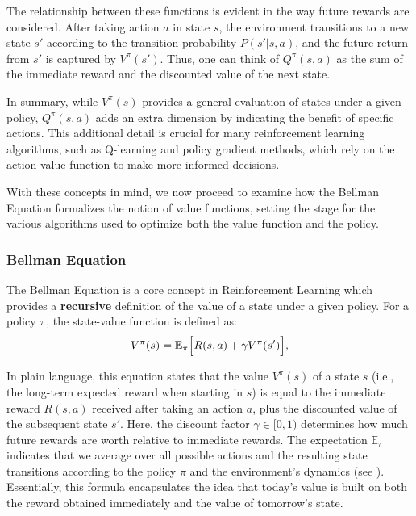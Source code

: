 \documentclass[12pt,a4paper,twoside,openany]{book}
\begin{document}
The relationship between these functions is evident in the way future rewards are considered. After taking action \(a\) in state \(s\), the environment transitions to a new state \(s'\) according to the transition probability \(P(s'|s,a)\), and the future return from \(s'\) is captured by \(V^\pi(s')\). Thus, one can think of \(Q^\pi(s,a)\) as the sum of the immediate reward and the discounted value of the next state.

In summary, while \(V^\pi(s)\) provides a general evaluation of states under a given policy, \(Q^\pi(s,a)\) adds an extra dimension by indicating the benefit of specific actions. This additional detail is crucial for many reinforcement learning algorithms, such as Q-learning and policy gradient methods, which rely on the action-value function to make more informed decisions.

With these concepts in mind, we now proceed to examine how the Bellman Equation formalizes the notion of value functions, setting the stage for the various algorithms used to optimize both the value function and the policy.

\subsubsection*{Bellman Equation}
The Bellman Equation is a core concept in Reinforcement Learning which provides a \textbf{recursive} definition of the value of a state under a given policy. For a policy \(\pi\), the state-value function is defined as:
\begin{equation}
V^{\pi}(s) = \mathbb{E}_{\pi}\Bigl[ R(s,a) + \gamma V^{\pi}(s') \Bigr],
\label{eq:bellman}
\end{equation}

In plain language, this equation states that the value \(V^{\pi}(s)\) of a state \(s\) (i.e., the long-term expected reward when starting in \(s\)) is equal to the immediate reward \(R(s,a)\) received after taking an action \(a\), plus the discounted value of the subsequent state \(s'\). Here, the discount factor \(\gamma \in [0,1)\) determines how much future rewards are worth relative to immediate rewards. The expectation \(\mathbb{E}_{\pi}\) indicates that we average over all possible actions and the resulting state transitions according to the policy \(\pi\) and the environment's dynamics (see \cite{Bellman1957,Sutton2000}). Essentially, this formula encapsulates the idea that today's value is built on both the reward obtained immediately and the value of tomorrow’s state.
\end{document}
